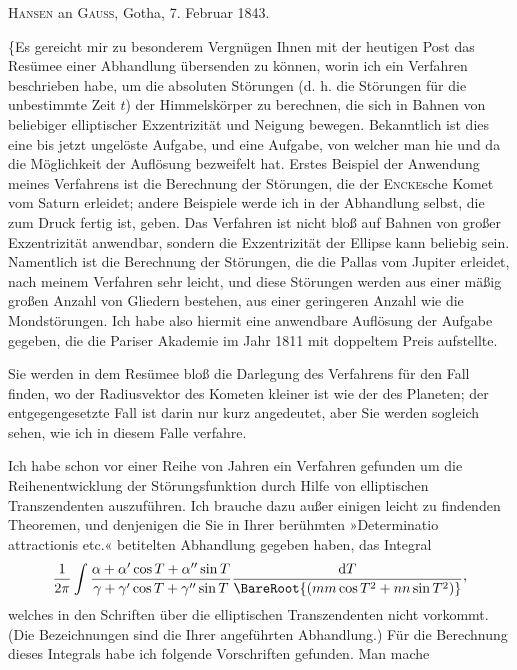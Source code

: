 \par{}\bigskip
\begin{center}
\textsc{Hansen} an \textsc{Gauss}, Gotha, 7. Februar 1843.
\end{center}
\noindent\hspace*{\parindent}\{Es gereicht mir zu besonderem Vergnügen Ihnen mit der heutigen Post das Resümee einer Abhandlung übersenden zu können, worin ich ein Verfahren beschrieben habe, um die absoluten Störungen (d. h. die Störungen für die unbestimmte Zeit \(t\)) der Himmelskörper zu berechnen, die sich in Bahnen von beliebiger elliptischer Exzentrizität und Neigung bewegen. Bekanntlich ist dies eine bis jetzt ungelöste Aufgabe, und eine Aufgabe, von welcher man hie und da die Möglichkeit der Auflösung bezweifelt hat. Erstes Beispiel der Anwendung meines Verfahrens ist die Berechnung der Störungen, die der \textsc{Encke}sche Komet vom Saturn erleidet; andere Beispiele werde ich in der Abhandlung selbst, die zum Druck fertig ist, geben. Das Verfahren ist nicht bloß auf Bahnen von großer Exzentrizität anwendbar, sondern die Exzentrizität der Ellipse kann beliebig sein. Namentlich ist die Berechnung der Störungen, die die Pallas vom Jupiter erleidet, nach meinem Verfahren sehr leicht, und diese Störungen werden aus einer mäßig großen Anzahl von Gliedern bestehen, aus einer geringeren Anzahl wie die Mondstörungen. Ich habe also hiermit eine anwendbare Auflösung der Aufgabe gegeben, die die Pariser Akademie im Jahr 1811 mit doppeltem Preis aufstellte.
\par{}Sie werden in dem Resümee bloß die Darlegung des Verfahrens für den Fall finden, wo der Radiusvektor des Kometen kleiner ist wie der des Planeten; der entgegengesetzte Fall ist darin nur kurz angedeutet, aber Sie werden sogleich sehen, wie ich in diesem Falle verfahre.
\par Ich habe schon vor einer Reihe von Jahren ein Verfahren gefunden um die Reihenentwicklung der Störungsfunktion durch Hilfe von elliptischen Transzendenten auszuführen. Ich brauche dazu außer einigen leicht zu findenden Theoremen, und denjenigen die Sie in Ihrer berühmten »Determinatio attractionis etc.« betitelten Abhandlung gegeben haben, das Integral
\[
\frac{1}{2\pi}\int\frac{\alpha+\alpha'\cos T+\alpha''\sin T}{\gamma+\gamma'\cos T+\gamma''\sin T}\frac{\mathrm{d}T}{\BareRoot{(mm\cos T^2+nn\sin T^2)}}\mathpunct{\raisebox{.45ex}{,}}
\]
welches in den Schriften über die elliptischen Transzendenten nicht vorkommt. (Die Bezeichnungen sind die Ihrer angeführten Abhandlung.) Für die Berechnung dieses Integrals habe ich folgende Vorschriften gefunden. Man mache
